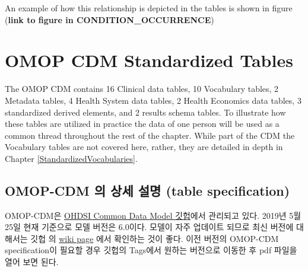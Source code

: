 \documentclass[]{book}
\begin{document}
An example of how this relationship is depicted in the tables is shown in figure (\textbf{link to figure in CONDITION\_OCCURRENCE})

\hypertarget{omop-cdm-standardized-tables}{%
\section{OMOP CDM Standardized Tables}\label{omop-cdm-standardized-tables}}

The OMOP CDM contains 16 Clinical data tables, 10 Vocabulary tables, 2 Metadata tables, 4 Health System data tables, 2 Health Economics data tables, 3 standardized derived elements, and 2 results schema tables. To illustrate how these tables are utilized in practice the data of one person will be used as a common thread throughout the rest of the chapter. While part of the CDM the Vocabulary tables are not covered here, rather, they are detailed in depth in Chapter \ref{StandardizedVocabularies}.

\hypertarget{omop-cdm----table-specification}{%
\subsection{OMOP-CDM 의 상세 설명 (table specification)}\label{omop-cdm----table-specification}}

OMOP-CDM은 \href{https://github.com/ohdsi/commondatamodel}{OHDSI Common Data Model 깃헙}에서 관리되고 있다. 2019년 5월 25일 현재 기준으로 모델 버전은 6.0이다. 모델이 자주 업데이트 되므로 최신 버전에 대해서는 깃헙 의 \href{https://github.com/OHDSI/CommonDataModel/wiki}{wiki page} 에서 확인하는 것이 좋다. 이전 버전의 OMOP-CDM specification이 필요할 경우 깃헙의 Tags에서 원하는 버전으로 이동한 후 pdf 파일을 열어 보면 된다.
\end{document}
